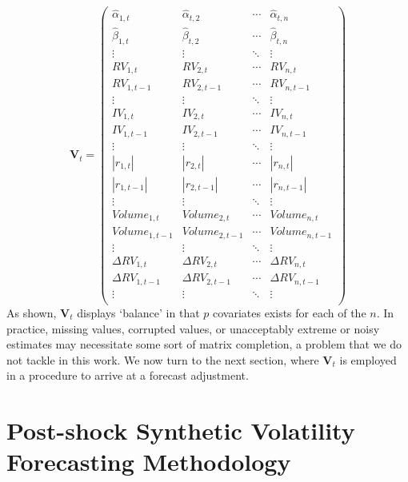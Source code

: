 \documentclass[11pt]{article}
\theoremstyle{definition}
\begin{document}
    \begin{equation*}
      \textbf{V}_{t} = 
      \begin{pmatrix}
      \hat\alpha_{1,t} & \hat\alpha_{t,2}  & \cdots & \hat\alpha_{t,n}  \\
      \hat\beta_{1,t} & \hat\beta_{t,2}  & \cdots & \hat\beta_{t,n}  \\
      \vdots  & \vdots  & \ddots & \vdots  \\
      RV_{1,t} & RV_{2,t}  & \cdots & RV_{n,t}  \\
      RV_{1,t-1}  & RV_{2,t-1}  & \cdots & RV_{n,t-1}  \\
      \vdots  & \vdots  & \ddots & \vdots  \\
      IV_{1,t} & IV_{2,t} & \cdots & IV_{n,t} \\
      IV_{1,t-1}  & IV_{2,t-1}  & \cdots & IV_{n,t-1} \\
      \vdots  & \vdots  & \ddots & \vdots  \\
      |r_{1,t}| & |r_{2,t}| & \cdots & |r_{n,t}| \\
      |r_{1,t-1}|  & |r_{2,t-1}|  & \cdots & |r_{n,t-1}| \\
      \vdots  & \vdots  & \ddots & \vdots  \\
      Volume_{1,t}  & Volume_{2,t}  & \cdots & Volume_{n,t} \\
      Volume_{1,t-1}  & Volume_{2,t-1}  & \cdots & Volume_{n,t-1}  \\
      \vdots  & \vdots  & \ddots & \vdots  \\
      \Delta RV_{1,t} & \Delta RV_{2,t}  & \cdots & \Delta RV_{n,t}  \\
      \Delta RV_{1,t-1}  & \Delta RV_{2,t-1}  & \cdots & \Delta RV_{n,t-1}  \\
      \vdots  & \vdots  & \ddots & \vdots  \\
      \end{pmatrix}
      \end{equation*}
      As shown, $\textbf{V}_{t}$ displays `balance' in that $p$ covariates exists for each of the $n$.  In practice, missing values, corrupted values, or unacceptably extreme or noisy estimates may necessitate some sort of matrix completion, a problem that we do not tackle in this work.  We now turn to the next section, where $\textbf{V}_{t}$ is employed in a procedure to arrive at a forecast adjustment. 
    

\section{Post-shock Synthetic Volatility Forecasting Methodology}
\end{document}
